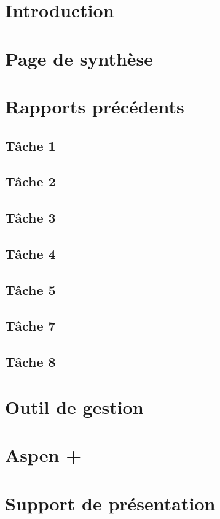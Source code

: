 \documentclass[a4paper,oneside,12pt]{report}
\begin{document}


\tableofcontents

\chapter{Introduction}
%
\chapter{Page de synthèse}
%

\appendix
\chapter{Rapports précédents}

\section{T\^ache 1}
%

\section{T\^ache 2}
%

\section{T\^ache 3}

\section{T\^ache 4}
%

\section{T\^ache 5}
%

\section{T\^ache 7}
%

\section{T\^ache 8}
%

\chapter{Outil de gestion}
%
\chapter{Aspen +}

\chapter{Support de présentation}


\printbibliography
\end{document}
